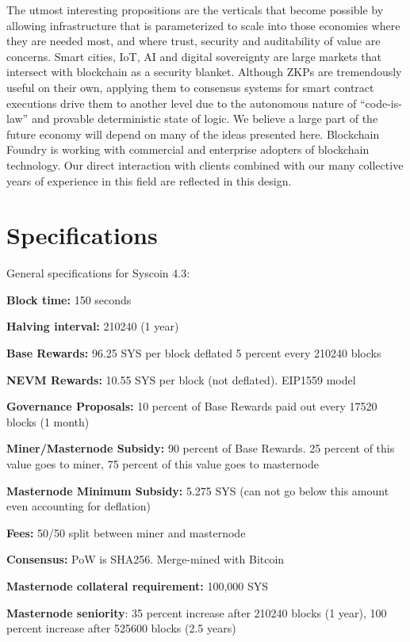 \documentclass[peerreview]{ieeesyscoin}
\begin{document}
The utmost interesting propositions are the verticals that become possible by allowing infrastructure that is parameterized to scale into those economies where they are needed most, and where trust, security and auditability of value are concerns. Smart cities, IoT, AI and digital sovereignty are large markets that intersect with blockchain as a security blanket. Although ZKPs are tremendously useful on their own, applying them to consensus systems for smart contract executions drive them to another level due to the autonomous nature of “code-is-law” and provable deterministic state of logic. We believe a large part of the future economy will depend on many of the ideas presented here. Blockchain Foundry is working with commercial and enterprise adopters of blockchain technology. Our direct interaction with clients combined with our many collective years of experience in this field are reflected in this design.


\section{Specifications}
\label{section:specs}

General specifications for Syscoin 4.3:

\begin{description}[font=$\bullet$~\normalfont\scshape\color{blue!50!black}]
\item \textbf{Block time:} 150 seconds
\item \textbf{Halving interval:} 210240 (1 year)
\item \textbf{Base Rewards:}  96.25 SYS per block deflated 5 percent every 210240 blocks
\item \textbf{NEVM Rewards:}  10.55 SYS per block (not deflated). EIP1559 model
\item \textbf{Governance Proposals:}  10 percent of Base Rewards paid out every 17520 blocks (1 month)
\item \textbf{Miner/Masternode Subsidy:}  90 percent of Base Rewards. 25 percent of this value goes to miner, 75 percent of this value goes to masternode
\item \textbf{Masternode Minimum Subsidy:} 5.275 SYS (can not go below this amount even accounting for deflation)
\item \textbf{Fees:}  50/50 split between miner and masternode
\item \textbf{Consensus:} PoW is SHA256. Merge-mined with Bitcoin
\item \textbf{Masternode collateral requirement:} 100,000 SYS
\item \textbf{Masternode seniority}: 35 percent increase after 210240 blocks (1 year), 100 percent increase after 525600 blocks (2.5 years)
\end{description}
\end{document}
